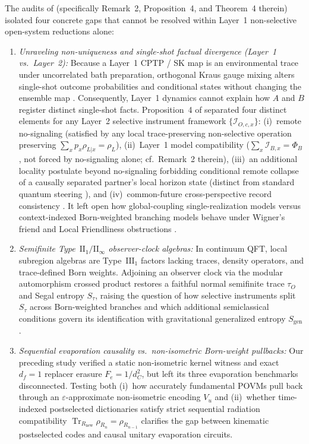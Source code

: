\documentclass[11pt,a4paper]{article}
\theoremstyle{definition}
\theoremstyle{remark}
\newcommand{\Tr}{\operatorname{Tr}}
\newcommand{\cI}{\mathcal{I}}
\newcommand{\1}{\mathbf{1}}
\begin{document}
The audits of \cite{Soga2026OSTQDSK} (specifically Remark~2, Proposition~4, and Theorem~4 therein) isolated four concrete gaps that cannot be resolved within Layer~1 non-selective open-system reductions alone:
\begin{enumerate}
  \item \emph{Unraveling non-uniqueness and single-shot factual divergence (Layer~1 vs.\ Layer~2):} Because a Layer~1 CPTP / SK map is an environmental trace under uncorrelated bath preparation, orthogonal Kraus gauge mixing alters single-shot outcome probabilities and conditional states without changing the ensemble map \cite{WisemanDiosi2001,Soga2026OSTQDSK}. Consequently, Layer~1 dynamics cannot explain how $A$ and $B$ register distinct single-shot facts. Proposition~4 of \cite{Soga2026OSTQDSK} separated four distinct elements for any Layer~2 selective instrument framework $\{\cI_{O,c,x}\}$: (i)~remote no-signaling (satisfied by any local trace-preserving non-selective operation preserving $\sum_x p_x\rho_{L|x}=\rho_L$), (ii)~Layer~1 model compatibility ($\sum_x\cI_{B,x}=\Phi_B$, not forced by no-signaling alone; cf.\ Remark~2 therein), (iii)~an additional locality postulate beyond no-signaling forbidding conditional remote collapse of a causally separated partner's local horizon state (distinct from standard quantum steering \cite{WisemanJonesDoherty2007}), and (iv)~common-future cross-perspective record consistency \cite{AdlamRovelli2022}. It left open how global-coupling single-realization models versus context-indexed Born-weighted branching models behave under Wigner's friend and Local Friendliness obstructions \cite{FrauchigerRenner2018,Bong2020,OrmrodBarrett2022,OrmrodVilasiniBarrett2023,HausmannRenner2025,Walleghem2025}.
  \item \emph{Semifinite Type~$\mathrm{II}_1/\mathrm{II}_\infty$ observer-clock algebras:} In continuum QFT, local subregion algebras are Type~$\mathrm{III}_1$ factors lacking traces, density operators, and trace-defined Born weights. Adjoining an observer clock via the modular automorphism crossed product \cite{Takesaki1973,Witten2022,CLPW2023,CPW2023,JensenSorceSperanza2023,DeVuyst2024,DeVuyst2025} restores a faithful normal semifinite trace $\tau_O$ and Segal entropy $S_\tau$, raising the question of how selective instruments split $S_\tau$ across Born-weighted branches and which additional semiclassical conditions govern its identification with gravitational generalized entropy $S_{\mathrm{gen}}$.
  \item \emph{Sequential evaporation causality vs.\ non-isometric Born-weight pullbacks:} Our preceding study \cite{Soga2026OSTQDSK} verified a static non-isometric kernel witness and exact $d_f=1$ replacer erasure $F_e=1/d_C^2$, but left its three evaporation benchmarks disconnected. Testing both (i)~how accurately fundamental POVMs pull back through an $\varepsilon$-approximate non-isometric encoding $V_u$ \cite{Akers2024} and (ii)~whether time-indexed postselected dictionaries satisfy strict sequential radiation compatibility $\Tr_{R_{\mathrm{new}}}\rho_{R_n}=\rho_{R_{n-1}}$ clarifies the gap between kinematic postselected codes and causal unitary evaporation circuits.

\end{enumerate}
\end{document}
